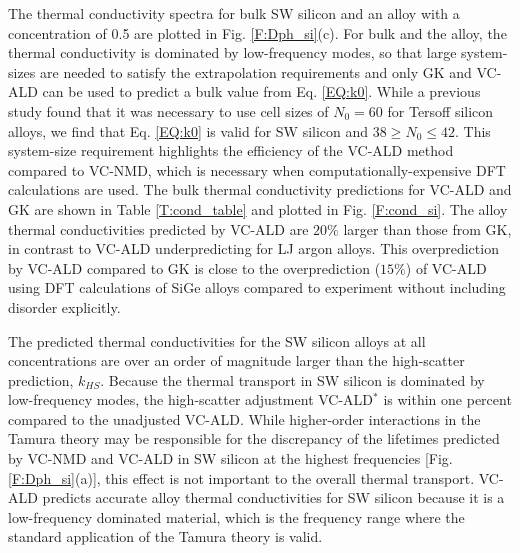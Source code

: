 \documentclass[aps,prb,onecolumn,preprint,footinbib,superscriptaddress,amsmath,amssymb,floatfix]{revtex4}
\begin{document}
The thermal conductivity spectra for bulk SW silicon and an alloy 
with a concentration of 0.5 are plotted in Fig. \ref{F:Dph_si}(c). 
For bulk and the alloy, the thermal conductivity is dominated by 
low-frequency modes, so that large system-sizes are needed to satisfy 
the extrapolation requirements and only GK and VC-ALD can be used to 
predict a bulk value from Eq. \eqref{EQ:k0}. While a previous 
study found that it was necessary to use cell sizes of $N_0 = 60$ for Tersoff silicon 
alloys,\cite{he_morphology_2011} we find that  
Eq. \eqref{EQ:k0} is valid for SW silicon and $38 \ge N_0 \le 42$. 
This system-size requirement highlights the efficiency of the 
VC-ALD method compared to VC-NMD, which is necessary when 
computationally-expensive DFT calculations are used.
\cite{esfarjani_method_2008,garg_role_2011,tian_phonon_2012,lindsay_thermal_2012,esfarjani_heat_2011,chaput_phonon-phonon_2011}
The bulk thermal conductivity 
predictions for VC-ALD and GK are shown in Table \ref{T:cond_table} and 
plotted in Fig. \ref{F:cond_si}. The alloy thermal conductivities predicted 
by VC-ALD are $20\%$ larger than those from GK, in contrast to VC-ALD 
underpredicting for LJ argon alloys. This overprediction 
by VC-ALD compared to GK is close to the overprediction ($15\%$) of VC-ALD 
using DFT calculations of SiGe alloys compared to experiment 
without including disorder explicitly.\cite{garg_role_2011} 

The predicted thermal conductivities for the SW silicon alloys at 
all concentrations are over an order of magnitude larger than
the high-scatter prediction, $k_{HS}$. 
Because the thermal transport in SW silicon 
is dominated by low-frequency modes, the high-scatter adjustment  
VC-ALD$^*$ is within one percent compared 
to the unadjusted VC-ALD. 
While higher-order interactions in the Tamura theory 
may be responsible for the 
discrepancy of the lifetimes predicted by VC-NMD and VC-ALD in SW silicon 
at the highest frequencies [Fig. \ref{F:Dph_si}(a)],  
this effect is not important to the overall
thermal transport. VC-ALD predicts accurate alloy thermal 
conductivities for SW silicon because it is a low-frequency 
dominated material, which is the frequency range where the standard 
application of the Tamura theory is valid.\cite{tamura_isotope_1983} 
\end{document}
